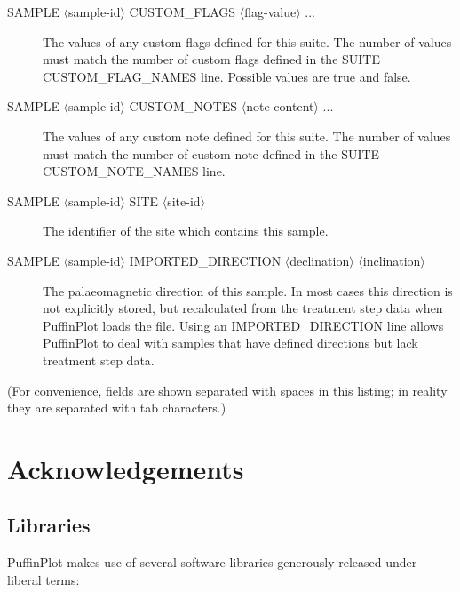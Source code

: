\documentclass[a4paper,british]{article}
\newcommand{\ppcmd}[1]{\textsf{#1}} %
\begin{document}
\begin{description}

\item[\ppcmd{SAMPLE $\langle$sample-id$\rangle$  CUSTOM\_FLAGS $\langle$flag-value$\rangle$  ...}] The values of any
custom flags defined for this suite. The number of values must match the number of
custom flags defined in the \ppcmd{SUITE CUSTOM\_FLAG\_NAMES} line. Possible values are
\ppcmd{true} and \ppcmd{false}.

\item[\ppcmd{SAMPLE $\langle$sample-id$\rangle$  CUSTOM\_NOTES $\langle$note-content$\rangle$  ...}] The values of any
custom note defined for this suite. The number of values must match the number of
custom note defined in the \ppcmd{SUITE CUSTOM\_NOTE\_NAMES} line.

\item[\ppcmd{SAMPLE $\langle$sample-id$\rangle$  SITE $\langle$site-id$\rangle$ }] The identifier of the site which contains this
sample.

\item[\ppcmd{SAMPLE $\langle$sample-id$\rangle$  IMPORTED\_DIRECTION $\langle$declination$\rangle$  $\langle$inclination$\rangle$ }] The palaeomagnetic
direction of this sample. In most cases this direction is not explicitly stored, but
recalculated from the treatment step data when PuffinPlot loads the file. Using an
\ppcmd{IMPORTED\_DIRECTION} line allows PuffinPlot to deal with samples that have defined directions but lack treatment step data.

\end{description}

\noindent (For convenience, fields are shown separated with spaces in this listing;
in reality they are separated with tab characters.)


\section{Acknowledgements}

\subsection*{Libraries}

PuffinPlot makes use of several software libraries generously released under
liberal terms:
\end{document}
